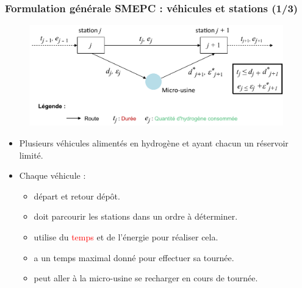 \documentclass[hyperref={bookmarks=false},aspectratio=169]{beamer}
\begin{document}

\begin{frame}
\frametitle{Formulation générale SMEPC : véhicules et stations (1/3)}


\begin{minipage}{.4\textwidth}%
 \begin{center}
\begin{figure}
    \centering%
    \includegraphics[width=11cm]{./figures/slide_Fr_Notation_inputs.pdf}%
    
    \label{fig:my_label}
\end{figure}
\end{center}
\end{minipage}%
\hfill
\vspace{3}
\begin{minipage}{.9\textwidth}%
\begin{itemize}
    \item Plusieurs véhicules alimentés en hydrogène et ayant chacun un réservoir limité.
    \space
    \item Chaque véhicule :
    \begin{itemize}
      \item départ et retour dépôt.
     \space
    \item  doit parcourir les stations dans un ordre à déterminer.%
    \space
    \item  utilise du \textcolor{red}{temps} et de l'\textcolor{greenn}{énergie} pour réaliser cela.
     \space
    \item  a un temps maximal donné pour effectuer sa tournée.
    \space
    \item peut aller à la micro-usine se recharger en cours de tournée.
    
    \end{itemize}
    
\end{itemize}
\end{minipage}%

\end{frame}
\end{document}

